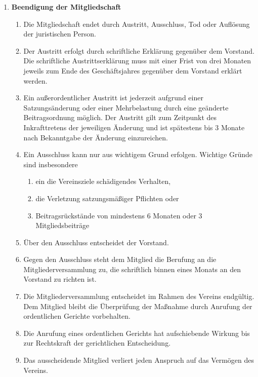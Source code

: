 \documentclass[german]{article}
\newcommand{\paragr}[1]{\item \textsf{\textbf{#1}}}
\begin{document}
\begin{enumerate}
\paragr{Beendigung der Mitgliedschaft}
\begin{enumerate}

\item Die Mitgliedschaft endet durch Austritt, Ausschluss, Tod oder Auflösung der juristischen Person.

\item Der Austritt erfolgt durch schriftliche Erklärung gegenüber dem Vorstand.
Die schriftliche Austrittserklärung muss mit einer Frist von drei Monaten jeweils zum Ende des Geschäftsjahres gegenüber dem Vorstand erklärt werden.

\item Ein außerordentlicher Austritt ist jederzeit aufgrund einer Satzungsänderung oder einer Mehrbelastung durch eine geänderte Beitragsordnung möglich.
Der Austritt gilt zum Zeitpunkt des Inkrafttretens der jeweiligen Änderung und ist spätestens bis 3 Monate nach Bekanntgabe der Änderung einzureichen.

\item Ein Ausschluss kann nur aus wichtigem Grund erfolgen.
Wichtige Gründe sind insbesondere
\begin{enumerate}
\item ein die Vereinsziele schädigendes Verhalten,
\item die Verletzung satzungsmäßiger Pflichten oder
\item Beitragsrückstände von mindestens 6 Monaten oder 3 Mitgliedsbeiträge
\end{enumerate}

\item Über den Ausschluss entscheidet der Vorstand.

\item Gegen den Ausschluss steht dem Mitglied die Berufung an die Mitgliederversammlung zu, die schriftlich binnen eines Monats an den Vorstand zu richten ist.

\item Die Mitgliederversammlung entscheidet im Rahmen des Vereins endgültig.
Dem Mitglied bleibt die Überprüfung der Maßnahme durch Anrufung der ordentlichen Gerichte vorbehalten.

\item Die Anrufung eines ordentlichen Gerichts hat aufschiebende Wirkung bis zur Rechtskraft der gerichtlichen Entscheidung.

\item Das ausscheidende Mitglied verliert jeden Anspruch auf das Vermögen des Vereins.


\end{enumerate}
\end{enumerate}
\end{document}
